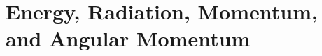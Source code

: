 \documentclass[12pt]{article}
\begin{document}
\newpage
\section{Energy, Radiation, Momentum, and Angular Momentum}

\end{document}
